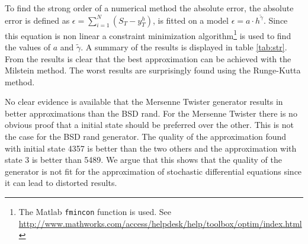 \documentclass[a4paper,onecolumn]{IEEEtran}
\begin{document}

To find the strong order of a numerical method the absolute error, the
absolute error is defined as $\epsilon = \sum_{i = 1}^N (S_T - y_T^h)$, is
fitted on a model $\epsilon = a \cdot h^{\widetilde{\gamma}}$. Since this
equation is non linear a constraint minimization algorithm\footnote{The Matlab
{\tt fmincon} function is used. See
\url{http://www.mathworks.com/access/helpdesk/help/toolbox/optim/index.html}}
is used to find the values of $a$ and $\widetilde{\gamma}$. A summary of the
results is displayed in table \ref{tab:str}. From the results is clear that
the best approximation can be achieved with the Milstein method. The worst
results are surprisingly found using the Runge-Kutta method.

No clear evidence is available that the Mersenne Twister generator results in
better approximations than the BSD rand. For the Mersenne Twister there is no
obvious proof that a initial state should be preferred over the other. This is
not the case for the BSD rand generator. The quality of the approximation
found with initial state 4357 is better than the two others and the
approximation with state 3 is better than 5489. We argue that this shows that
the quality of the generator is not fit for the approximation of stochastic
differential equations since it can lead to distorted results.
\end{document}
